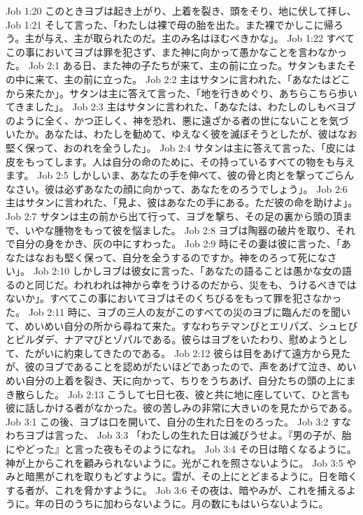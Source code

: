 Job 1:20  このときヨブは起き上がり、上着を裂き、頭をそり、地に伏して拝し、
Job 1:21  そして言った、「わたしは裸で母の胎を出た。また裸でかしこに帰ろう。主が与え、主が取られたのだ。主のみ名はほむべきかな」。
Job 1:22  すべてこの事においてヨブは罪を犯さず、また神に向かって愚かなことを言わなかった。
Job 2:1  ある日、また神の子たちが来て、主の前に立った。サタンもまたその中に来て、主の前に立った。
Job 2:2  主はサタンに言われた、「あなたはどこから来たか」。サタンは主に答えて言った、「地を行きめぐり、あちらこちら歩いてきました」。
Job 2:3  主はサタンに言われた、「あなたは、わたしのしもべヨブのように全く、かつ正しく、神を恐れ、悪に遠ざかる者の世にないことを気づいたか。あなたは、わたしを勧めて、ゆえなく彼を滅ぼそうとしたが、彼はなお堅く保って、おのれを全うした」。
Job 2:4  サタンは主に答えて言った、「皮には皮をもってします。人は自分の命のために、その持っているすべての物をも与えます。
Job 2:5  しかしいま、あなたの手を伸べて、彼の骨と肉とを撃ってごらんなさい。彼は必ずあなたの顔に向かって、あなたをのろうでしょう」。
Job 2:6  主はサタンに言われた、「見よ、彼はあなたの手にある。ただ彼の命を助けよ」。
Job 2:7  サタンは主の前から出て行って、ヨブを撃ち、その足の裏から頭の頂まで、いやな腫物をもって彼を悩ました。
Job 2:8  ヨブは陶器の破片を取り、それで自分の身をかき、灰の中にすわった。
Job 2:9  時にその妻は彼に言った、「あなたはなおも堅く保って、自分を全うするのですか。神をのろって死になさい」。
Job 2:10  しかしヨブは彼女に言った、「あなたの語ることは愚かな女の語るのと同じだ。われわれは神から幸をうけるのだから、災をも、うけるべきではないか」。すべてこの事においてヨブはそのくちびるをもって罪を犯さなかった。
Job 2:11  時に、ヨブの三人の友がこのすべての災のヨブに臨んだのを聞いて、めいめい自分の所から尋ねて来た。すなわちテマンびとエリパズ、シュヒびとビルダデ、ナアマびとゾパルである。彼らはヨブをいたわり、慰めようとして、たがいに約束してきたのである。
Job 2:12  彼らは目をあげて遠方から見たが、彼のヨブであることを認めがたいほどであったので、声をあげて泣き、めいめい自分の上着を裂き、天に向かって、ちりをうちあげ、自分たちの頭の上にまき散らした。
Job 2:13  こうして七日七夜、彼と共に地に座していて、ひと言も彼に話しかける者がなかった。彼の苦しみの非常に大きいのを見たからである。
Job 3:1  この後、ヨブは口を開いて、自分の生れた日をのろった。
Job 3:2  すなわちヨブは言った、
Job 3:3  「わたしの生れた日は滅びうせよ。『男の子が、胎にやどった』と言った夜もそのようになれ。
Job 3:4  その日は暗くなるように。神が上からこれを顧みられないように。光がこれを照さないように。
Job 3:5  やみと暗黒がこれを取りもどすように。雲が、その上にとどまるように。日を暗くする者が、これを脅かすように。
Job 3:6  その夜は、暗やみが、これを捕えるように。年の日のうちに加わらないように。月の数にもはいらないように。
